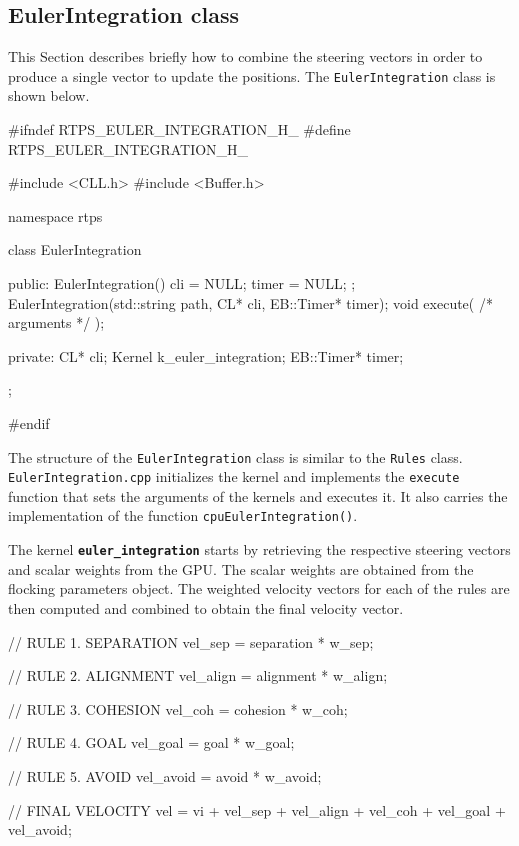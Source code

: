 


\subsection{EulerIntegration class} \label{eulerclass}
This Section describes briefly how to combine the steering vectors in order to produce a single vector to update the positions. The \texttt{EulerIntegration} class is shown below.

\begin{cppcode}{0}
#ifndef RTPS_EULER_INTEGRATION_H_
#define RTPS_EULER_INTEGRATION_H_

#include <CLL.h>
#include <Buffer.h>

namespace rtps
{
	class EulerIntegration
	{
		public:
			EulerIntegration() { cli = NULL; timer = NULL; };
	 		EulerIntegration(std::string path, CL* cli, EB::Timer* timer);
			void execute( /* arguments */ );

		private:
			CL* cli;
			Kernel k_euler_integration;
			EB::Timer* timer;
	};
}
#endif
\end{cppcode}

The structure of the \texttt{EulerIntegration} class is similar to the \texttt{Rules} class. \texttt{EulerIntegration.cpp} initializes the kernel and implements the \texttt{execute} function that sets the arguments of the kernels and executes it. It also carries the implementation of the function \texttt{cpuEulerIntegration()}. 

The kernel \texttt{\textbf{euler\_integration}} starts by retrieving the respective steering vectors and scalar weights from the GPU. The scalar weights are obtained from the flocking parameters object. The weighted velocity vectors for each of the rules are then computed and combined to obtain the final velocity vector.

\begin{cppcode}{0}
// RULE 1. SEPARATION
vel_sep = separation * w_sep;
   
// RULE 2. ALIGNMENT
vel_align = alignment * w_align;

// RULE 3. COHESION
vel_coh = cohesion * w_coh;

// RULE 4. GOAL
vel_goal = goal * w_goal;

// RULE 5. AVOID
vel_avoid = avoid * w_avoid;

// FINAL VELOCITY
vel = vi + vel_sep + vel_align + vel_coh + vel_goal + vel_avoid;
\end{cppcode}

